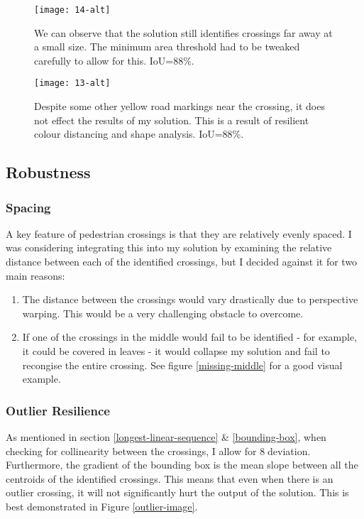\documentclass{article}  %
\begin{document}
	\begin{figure}[H]
		\begin{minipage}[c]{0.45\linewidth}
			\centering
			\texttt{[image: 14-alt]}
			\caption{We can observe that the solution still identifies crossings far away at a small size. The minimum area threshold had to be tweaked carefully to allow for this. IoU=88\%.}
		\end{minipage}\hfill
		\begin{minipage}[c]{0.45\linewidth}
			\centering
			\texttt{[image: 13-alt]}
			\caption{Despite some other yellow road markings near the crossing, it does not effect the results of my solution. This is a result of resilient colour distancing and shape analysis. IoU=88\%.}
		\end{minipage}
	\end{figure}
	
	\newpage
	\subsection{Robustness}
	
	\subsubsection{Spacing}
	
	A key feature of pedestrian crossings is that they are relatively evenly spaced. I was considering integrating this into my solution by examining the relative distance between each of the identified crossings, but I decided against it for two main reasons: 
	\begin{enumerate}
		\item The distance between the crossings would vary drastically due to perspective warping. This would be a very challenging obstacle to overcome.
		\item If one of the crossings in the middle would fail to be identified - for example, it could be covered in leaves - it would collapse my solution and fail to recongise the entire crossing. See figure \ref{missing-middle} for a good visual example.
	\end{enumerate}
	
	\subsubsection{Outlier Resilience}
	
	As mentioned in section \ref{longest-linear-sequence} \& \ref{bounding-box}, when checking for collinearity between the crossings, I allow for 8\textdegree $\;$deviation. Furthermore, the gradient of the bounding box is the mean slope between all the centroids of the identified crossings. This means that even when there is an outlier crossing, it will not significantly hurt the output of the solution. This is best demonstrated in Figure \ref{outlier-image}.
	
\end{document}
